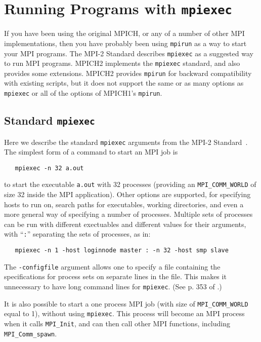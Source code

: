 \documentclass[dvipdfm,11pt]{article}
\begin{document}
\section{Running Programs with \texttt{mpiexec}}
\label{sec:mpiexec}

If you have been using the original MPICH, or any of a number of other MPI
implementations, then you have probably been using \texttt{mpirun} as a
way to start your MPI programs.
The MPI-2 Standard describes \texttt{mpiexec} as a suggested way to run
MPI programs.  MPICH2 implements the \texttt{mpiexec} standard, and also
provides some extensions.  MPICH2 provides \texttt{mpirun} for backward
compatibility with existing scripts, but it does not support the same or
as many options as \texttt{mpiexec} or all of the options of MPICH1's
\texttt{mpirun}.   

\subsection{Standard \texttt{mpiexec}}
\label{sec:mpiexec-standard}

Here we describe the standard \texttt{mpiexec} arguments from the MPI-2
Standard~\cite{mpi-forum:mpi2-journal}.  The simplest form of a command
to start an MPI job is 
\begin{verbatim}
   mpiexec -n 32 a.out
\end{verbatim}
to start the executable \texttt{a.out} with 32 processes (providing an
\texttt{MPI\_COMM\_WORLD} of size 32 inside the MPI application).  Other
options are supported, for specifying hosts to run on,  search paths for
executables, working directories, and even a more general way of
specifying a number of processes.  Multiple sets of processes can be run
with different exectuables and different values for their arguments,
with ``\texttt{:}'' separating the sets of processes, as in:
\begin{verbatim}
   mpiexec -n 1 -host loginnode master : -n 32 -host smp slave
\end{verbatim}
The \texttt{-configfile} argument allows one to specify a file containing the
specifications for process sets on separate lines in the file.  This
makes it unnecessary to have long command lines for \texttt{mpiexec}.  
(See p. 353 of \cite{Snir:1998:MPI2Book}.)

It is also possible to start a one process MPI job (with size of
\texttt{MPI\_COMM\_WORLD} equal to 1), without using \texttt{mpiexec}.
This process will become an MPI process when it calls
\texttt{MPI\_Init}, and can then call other MPI functions, including
\texttt{MPI\_Comm\_spawn}. 
\end{document}
